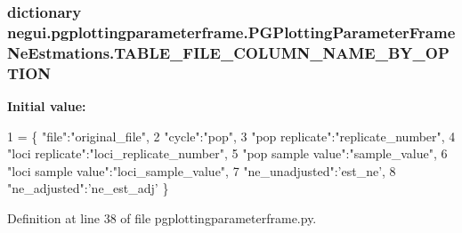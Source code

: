 \subsubsection[{\texorpdfstring{T\+A\+B\+L\+E\+\_\+\+F\+I\+L\+E\+\_\+\+C\+O\+L\+U\+M\+N\+\_\+\+N\+A\+M\+E\+\_\+\+B\+Y\+\_\+\+O\+P\+T\+I\+ON}{TABLE_FILE_COLUMN_NAME_BY_OPTION}}]{\setlength{\rightskip}{0pt plus 5cm}dictionary negui.\+pgplottingparameterframe.\+P\+G\+Plotting\+Parameter\+Frame\+Ne\+Estmations.\+T\+A\+B\+L\+E\+\_\+\+F\+I\+L\+E\+\_\+\+C\+O\+L\+U\+M\+N\+\_\+\+N\+A\+M\+E\+\_\+\+B\+Y\+\_\+\+O\+P\+T\+I\+ON\hspace{0.3cm}{\ttfamily [static]}}\hypertarget{classnegui_1_1pgplottingparameterframe_1_1PGPlottingParameterFrameNeEstmations_a3590d8312a94767fa319b42d5de1a31f}{}\label{classnegui_1_1pgplottingparameterframe_1_1PGPlottingParameterFrameNeEstmations_a3590d8312a94767fa319b42d5de1a31f}
{\bfseries Initial value\+:}
\begin{DoxyCode}
1 = \{ \textcolor{stringliteral}{"file"}:\textcolor{stringliteral}{"original\_file"},
2                                         \textcolor{stringliteral}{"cycle"}:\textcolor{stringliteral}{"pop"},
3                                         \textcolor{stringliteral}{"pop replicate"}:\textcolor{stringliteral}{"replicate\_number"},
4                                         \textcolor{stringliteral}{"loci replicate"}:\textcolor{stringliteral}{"loci\_replicate\_number"},
5                                         \textcolor{stringliteral}{"pop sample value"}:\textcolor{stringliteral}{"sample\_value"},
6                                         \textcolor{stringliteral}{"loci sample value"}:\textcolor{stringliteral}{"loci\_sample\_value"},
7                                         \textcolor{stringliteral}{"ne\_unadjusted"}:\textcolor{stringliteral}{'est\_ne'},
8                                         \textcolor{stringliteral}{"ne\_adjusted"}:\textcolor{stringliteral}{'ne\_est\_adj'} \}
\end{DoxyCode}


Definition at line 38 of file pgplottingparameterframe.\+py.

